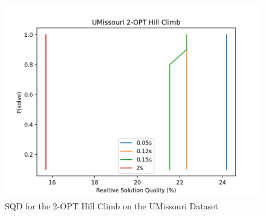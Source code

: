 \documentclass[format=sigconf]{acmart}
\begin{document}
\begin{figure}[htbp]
    \centerline{\includegraphics[scale=.5]{graphs/UMissouri_LS1_SQD.png}}
    \caption{SQD for the 2-OPT Hill Climb on the UMissouri Dataset}
    \label{fig:7}
\end{figure}
\end{document}
